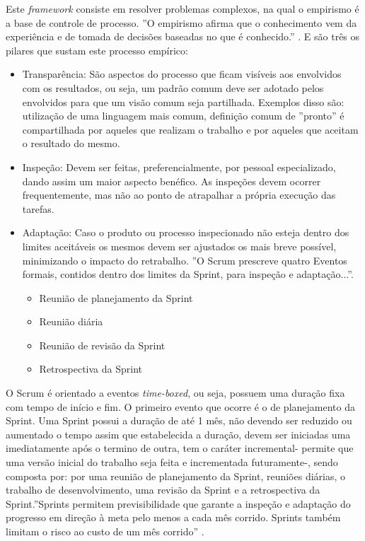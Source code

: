 	Este \textit{framework} consiste em resolver problemas complexos, na qual o empirismo é a base de controle de processo. ''O empirismo afirma que o conhecimento vem da experiência e de tomada de decisões baseadas no que é conhecido.'' \cite{scrum}. E são três os pilares que sustam este processo empírico:
	\begin{itemize}
		\item Transparência: São aspectos do processo que ficam visíveis aos envolvidos com os resultados, ou seja, um padrão comum deve ser adotado pelos envolvidos para que um visão comum seja partilhada. Exemplos disso são: utilização de uma linguagem mais comum, definição comum de ''pronto'' é compartilhada por aqueles que realizam o trabalho e por aqueles que aceitam o resultado do mesmo. 
		\item Inspeção: Devem ser feitas, preferencialmente, por pessoal especializado, dando assim um maior aspecto benéfico. As inspeções devem ocorrer frequentemente, mas não ao ponto de atrapalhar a própria execução das tarefas.
		\item Adaptação: Caso o produto ou processo inspecionado não esteja dentro dos limites aceitáveis os mesmos devem ser ajustados os mais breve possível, minimizando o impacto do retrabalho. ''O Scrum prescreve quatro Eventos formais, contidos dentro dos limites da Sprint, para inspeção e adaptação...''\cite{scrum}.
		\begin{itemize}
			\item Reunião de planejamento da Sprint
			\item Reunião diária
			\item Reunião de revisão da Sprint
			\item Retrospectiva da Sprint
		\end{itemize}
	\end{itemize} 

	O Scrum é orientado a eventos \textit{time-boxed}, ou seja, possuem uma duração fixa com tempo de início e fim. O primeiro evento que ocorre é o de planejamento da Sprint. Uma Sprint possui a duração de até 1 mês, não devendo ser reduzido ou aumentado o tempo assim que estabelecida a duração, devem ser iniciadas uma imediatamente após o termino de outra, tem o caráter incremental- permite que uma versão inicial do trabalho seja feita e incrementada futuramente-, sendo composta por: por uma reunião de planejamento da Sprint, reuniões diárias, o trabalho de desenvolvimento, uma revisão da Sprint e a retrospectiva da Sprint.''Sprints permitem previsibilidade que garante a inspeção e adaptação do progresso em direção à meta pelo menos a cada mês corrido. Sprints também limitam o risco ao custo de um mês corrido'' \cite[p.~8]{scrum}.

